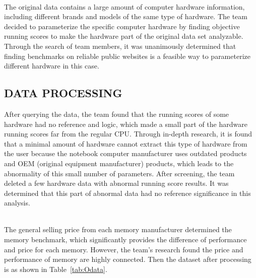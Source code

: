 \documentclass{scrartcl}
\begin{document}
~\\
\noindent The original data contains a large amount of computer hardware information, including different brands and models of the same type of hardware. The team decided to parameterize the specific computer hardware by finding objective running scores to make the hardware part of the original data set analyzable. Through the search of team members, it was unanimously determined that finding benchmarks \cite{passmark} on reliable public websites is a feasible way to parameterize different hardware in this case. 


\subsection{DATA PROCESSING}
After querying the data, the team found that the running scores of some hardware had no reference and logic, which made a small part of the hardware running scores far from the regular CPU. Through in-depth research, it is found that a minimal amount of hardware cannot extract this type of hardware from the user because the notebook computer manufacturer uses outdated products and OEM (original equipment manufacturer) products, which leads to the abnormality of this small number of parameters. After screening, the team deleted a few hardware data with abnormal running score results. It was determined that this part of abnormal data had no reference significance in this analysis.\par
~\\
\noindent The general selling price from each memory manufacturer determined the memory benchmark, which significantly provides the difference of performance and price for each memory. However, the team's research found the price and performance of memory are highly connected. Then the dataset after processing is as shown in Table~\ref{tab:Odata}.
~\\
\end{document}
